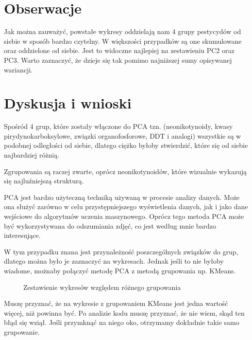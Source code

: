 \documentclass[12pt, a4paper]{article}
\begin{document}
\section{Obserwacje}
    
    Jak można zauważyć, powstałe wykresy oddzielają nam 4 grupy pestycydów od siebie
    w sposób bardzo czytelny. W większości przypadków są one skumulowane oraz oddzielone od siebie. Jest to
    widoczne najlepiej na zestawieniu PC2 oraz PC3. Warto zaznaczyć, że dzieje się tak pomimo najniższej sumy opisywanej wariancji.

\section{Dyskusja i wnioski}

    Spośród 4 grup, które zostały włączone do PCA tzn. (neonikotynoidy, kwasy pirydynokarboksylowe, związki organofosforowe, DDT i analogi)
    wszystkie są w podobnej odległości od siebie, dlatego ciężko byłoby stwierdzić, które się od siebie najbardziej różnią.

    Zgrupowania są raczej zwarte, oprócz neonikotynoidów, które wizualnie wykazują się najluźniejszą strukturą.

    PCA jest bardzo użyteczną techniką używaną w procesie analizy danych. Może ona służyć zarówno w celu przystępniejszego
    wyświetlenia danych, jak i jako dane wejściowe do algorytmów uczenia maszynowego. Oprócz tego metoda
    PCA może być wykorzystywana do odszumiania zdjęć, co jest według mnie bardzo interesujące. 

    W tym przypadku znana jest przynależność poszczególnych związków do grup, dlatego można było je zaznaczyć na wykresach.
    Jednak jeśli to nie byłoby wiadome, możnaby połączyć metodę PCA z metodą grupowania np. KMeans. 

    \begin{figure}
        \centering
        \qquad
        \caption{Zestawienie wykresów względem różnego grupowania}
    \end{figure}

    Muszę przyznać, że na wykresie z grupowaniem KMeans jest jedna wartość więcej, niż powinna być.
    Po analizie kodu muszę przyznać, że nie wiem, skąd ten błąd się wziął. Jeśli przymknąć na niego oko,
    otrzymamy dokładnie takie samo grupowanie.
\end{document}

